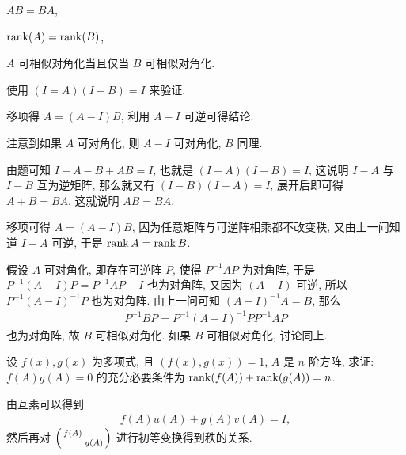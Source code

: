 \begin{exercise}[series=exer]
  \begin{exercise}
      \item $ AB = BA $,
      \item $ \rank(A) = \rank(B) $,
      \item $ A $ 可相似对角化当且仅当 $ B $ 可相似对角化.
  \end{exercise}
  \begin{hint}
      \begin{hintsheet}
          \item 使用 $ (I = A)(I - B) = I $ 来验证.
          \item 移项得 $ A = (A - I)B $, 利用 $ A - I $ 可逆可得结论.
          \item 注意到如果 $ A $ 可对角化, 则 $ A - I $ 可对角化, $ B $ 同理.
      \end{hintsheet}
  \end{hint}
  \begin{answer}
      \begin{answersheet}
          \item 由题可知 $ I - A - B + AB = I $, 也就是 $ (I - A)(I - B) = I $, 这说明 $ I - A $ 与 $ I - B $ 互为逆矩阵, 那么就又有 $ (I - B)(I - A) = I $, 展开后即可得 $ A + B = BA $, 这就说明 $ AB = BA $.
          \item 移项可得 $ A = (A - I)B $, 因为任意矩阵与可逆阵相乘都不改变秩, 又由上一问知道 $ I - A $ 可逆, 于是 $ \rank A = \rank B $.
          \item 假设 $ A $ 可对角化, 即存在可逆阵 $ P $, 使得 $ P^{-1}AP $ 为对角阵, 于是 $ P^{-1}(A - I)P = P^{-1}AP - I $ 也为对角阵, 又因为 $ (A - I) $ 可逆, 所以 $ P^{-1}(A - I)^{-1}P $ 也为对角阵. 由上一问可知 $ (A - I)^{-1}A = B $, 那么
          \begin{align*}
              P^{-1}BP = P^{-1}(A - I)^{-1}PP^{-1}AP
          \end{align*}
          也为对角阵, 故 $ B $ 可相似对角化. 如果 $ B $ 可相似对角化, 讨论同上.
      \end{answersheet}
  \end{answer}
  \sitem 设 $ f(x), g(x) $ 为多项式, 且 $ (f(x), g(x)) = 1 $, $ A $ 是 $ n $ 阶方阵, 求证: $ f(A)g(A) = 0 $ 的充分必要条件为 $ \rank(f(A)) + \rank(g(A)) = n $.
  \begin{hint}
      由互素可以得到
      \begin{align*}
          f(A)u(A) + g(A)v(A) = I,
      \end{align*}
      然后再对 $ \smqty(f(A) & \\ & g(A)) $ 进行初等变换得到秩的关系.

\end{hint}
\end{exercise}
